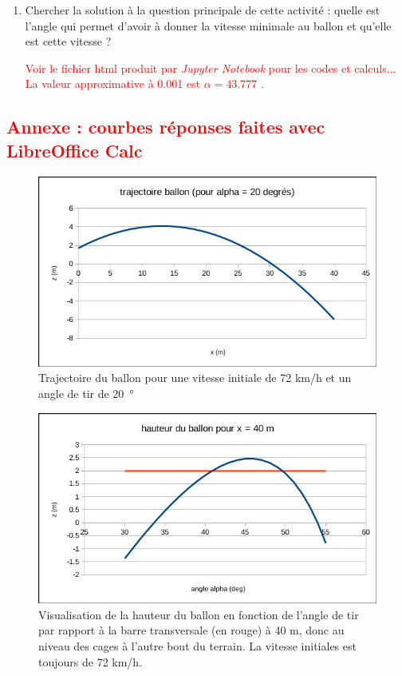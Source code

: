 \documentclass[french,a4paper,10pt]{article}
\begin{document}
\begin{enumerate}
    \item Chercher la solution à la question principale de cette activité : quelle est l'angle qui permet d'avoir à donner la vitesse minimale au ballon et qu'elle est cette vitesse ?\\
\begin{reponse}
    \textcolor{red}{Voir le fichier html produit par \emph{Jupyter Notebook} pour les codes et calculs... La valeur approximative à 0.001 est $\alpha = 43.777$ \textdegree.} 
\end{reponse}

\end{enumerate}

\begin{reponse}
\textcolor{red}{\section{Annexe : courbes réponses faites avec LibreOffice Calc}}
\begin{figure}[h]
    \includegraphics[width=.8\linewidth]{courbe_trajectoire.png}
    \caption{Trajectoire du ballon pour une vitesse initiale de 72 km/h et un angle de tir de 20~°}
\end{figure}

\begin{figure}[h]
    \includegraphics[width=.8\linewidth]{courbe_alpha.png}
    \caption{Visualisation de la hauteur du ballon en fonction de l'angle de tir par rapport à la barre transversale (en rouge) à 40 m, donc au niveau des cages à l'autre bout du terrain. La vitesse initiales est toujours de 72 km/h.}
\end{figure}


\end{reponse}
\end{document}
